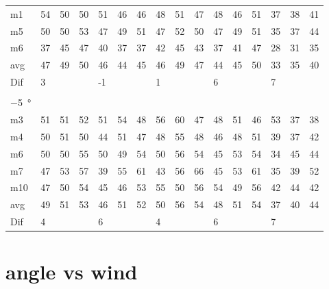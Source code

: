 \begin{table}[H]
\begin{tabular}{l|l|l|l|l|l|l|l|l|l|l|l|l|lll}
m1    & 54     &   50   &    50  &  51    &  46    &  46    &  48    &    51   &  47    &  48     & 46     &  51    & \multicolumn{1}{l|}{37} & \multicolumn{1}{l|}{38} & 41 \\
m5    &  50    &   50   &   53   &  47    &   49   &  51    &   47   &   52    &  50    &  47     &  49    &  51    & \multicolumn{1}{l|}{35} & \multicolumn{1}{l|}{37} & 44 \\
m6    &  37    &   45   &   47   &   40   &   37   &  37    &  42    &   45    &   43   &   37    &  41    &   47   & \multicolumn{1}{l|}{28} & \multicolumn{1}{l|}{31} & 35 \\ \hline
avg   &  47    &  49    &  50    &  46    &   44   &   45   &  46    &  49     &  47    &  44     &  45    &   50   & \multicolumn{1}{l|}{33} & \multicolumn{1}{l|}{35}  &  40 \\ \hline 
Dif & \multicolumn{3}{l|}{3} & \multicolumn{3}{l|}{-1} & \multicolumn{3}{l|}{1} & \multicolumn{3}{l|}{6} & \multicolumn{3}{l}{7} \\ 
\multicolumn{16}{l}{ } \\  
\SI{-5}{\degree}   & \multicolumn{3}{l|}{} & \multicolumn{3}{l|}{} & \multicolumn{3}{l|}{} & \multicolumn{3}{l|}{} & \multicolumn{3}{l}{}   \\  \hline
m3    & 51     & 51     &   52   &   51   &   54   &  48    &  56    &   60    &  47    &   48    &  51    &  46    & \multicolumn{1}{l|}{53} & \multicolumn{1}{l|}{37} & 38 \\
m4    &  50    &  51    &  50    &  44    &   51   &  47    &  48    &  55     &   48   &   46    &  48    &   51   & \multicolumn{1}{l|}{39} & \multicolumn{1}{l|}{37} & 42 \\
m6    &  50    &  50    &   55   &   50   &   49   &  54    &  50    &   56    &   54   &   45    & 53     &  54    & \multicolumn{1}{l|}{34} & \multicolumn{1}{l|}{45} & 44 \\
m7    &  47    &  53    &  57    &   39   &   55   &  61    &  43    &   56    &   66   &   45    &   53   &  61    & \multicolumn{1}{l|}{35} & \multicolumn{1}{l|}{39} &  52\\
m10  &  47    &   50   &   54   &   45   &   46   &  53    &  55    &   50    &   56   &  54     &   49   &   56   & \multicolumn{1}{l|}{42} & \multicolumn{1}{l|}{44} &  42\\ \hline
avg   &   49   &   51   & 53     &   46   &    51  & 52     &  50    &   56    &   54   &   48    &   51   &  54    & \multicolumn{1}{l|}{37} & \multicolumn{1}{l|}{40}  & 44  \\ \hline 
Dif & \multicolumn{3}{l|}{4} & \multicolumn{3}{l|}{6} & \multicolumn{3}{l|}{4} & \multicolumn{3}{l|}{6} & \multicolumn{3}{l}{7}    
\end{tabular}
\end{table}




\section{angle vs wind}\label{mes:kudo:relaton}